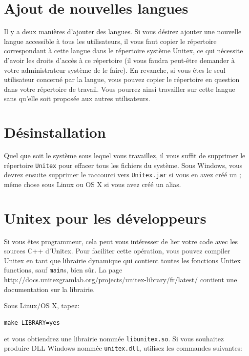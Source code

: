 \section{Ajout de nouvelles langues}

\bigskip
\noindent Il y a deux manières d’ajouter des langues. Si vous désirez ajouter une nouvelle langue
accessible à tous les utilisateurs, il vous faut copier le répertoire correspondant à cette langue
dans le répertoire système Unitex,
ce qui nécessite d’avoir les droits d’accès à ce répertoire
(il vous faudra peut-être demander à votre administrateur système de le faire).
En revanche, si vous êtes le seul utilisateur concerné par la langue, vous pouvez copier le répertoire
en question dans votre répertoire de travail.
Vous pourrez ainsi travailler sur cette langue sans qu’elle soit proposée aux autres utilisateurs.



\section{Désinstallation}
Quel que soit le système sous lequel vous travaillez, il vous suffit de supprimer le répertoire
\verb+Unitex+ pour effacer tous les fichiers du système. Sous Windows, vous devrez ensuite supprimer
le raccourci vers \verb+Unitex.jar+  si vous en avez créé un ;
même chose sous Linux ou OS X si vous avez créé un alias.


\section{Unitex pour les développeurs}
\label{section-unitex-developpers}
Si vous êtes programmeur, cela peut vous intéresser de lier votre code avec les sources C++
d'Unitex. Pour faciliter cette opération, vous pouvez compiler Unitex en tant que librairie
dynamique qui contient toutes les fonctions Unitex functions, sauf \verb+main+s, bien sûr. La
page \url{http://docs.unitexgramlab.org/projects/unitex-library/fr/latest/} contient une documentation sur la librairie.


\bigskip
Sous Linux/OS X, tapez:

\bigskip
\verb+make LIBRARY=yes+

\bigskip
\noindent et vous obtiendrez une librairie nommée \verb+libunitex.so+. Si vous souhaitez produire 
DLL Windows nommée \verb+unitex.dll+, utilisez les commandes suivantes:

